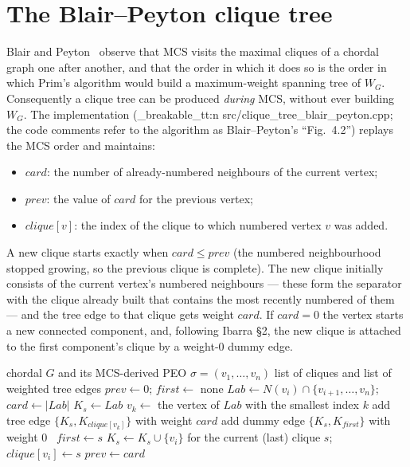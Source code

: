 \documentclass[11pt,a4paper,oneside]{report}
\theoremstyle{plain}
\theoremstyle{definition}
\theoremstyle{remark}
\DeclareRobustCommand{\file}[1]{\mtp_breakable_tt:n {#1}}
\begin{document}
\section{The Blair--Peyton clique tree}\label{sec:bp}
Blair and Peyton~\cite[\S4.2]{blair1993} observe that MCS visits the maximal cliques of a
chordal graph one after another, and that the order in which it does so is the order in which
Prim's algorithm would build a maximum-weight spanning tree of \(W_G\). Consequently a clique
tree can be produced \emph{during} MCS, without ever building \(W_G\). The implementation
(\file{src/clique_tree_blair_peyton.cpp}; the code comments refer to the algorithm as
Blair--Peyton's ``Fig.~4.2'') replays the MCS order and maintains:
\begin{itemize}
\item \(\mathit{card}\): the number of already-numbered neighbours of the current vertex;
\item \(\mathit{prev}\): the value of \(\mathit{card}\) for the previous vertex;
\item \(\mathit{clique}[v]\): the index of the clique to which numbered vertex \(v\) was added.
\end{itemize}
A new clique starts exactly when \(\mathit{card}\le\mathit{prev}\) (the numbered neighbourhood
stopped growing, so the previous clique is complete). The new clique initially consists of the
current vertex's numbered neighbours --- these form the separator with the clique already built
that contains the most recently numbered of them --- and the tree edge to that clique gets
weight \(\mathit{card}\). If \(\mathit{card}=0\) the vertex starts a new connected component,
and, following Ibarra \S2, the new clique is attached to the first component's clique by a
weight-0 dummy edge.

\begin{algorithm}[ht]
\caption{Clique tree from MCS (after Blair and Peyton~\cite[\S4.2]{blair1993}) with dummy edges
(Ibarra \S2)}\label{alg:bp}
\begin{algorithmic}[1]
\Require chordal \(G\) and its MCS-derived PEO \(\sigma=(v_1,\dots,v_n)\)
\Ensure list of cliques and list of weighted tree edges
\State \(\mathit{prev}\gets 0\); \(\mathit{first}\gets\) none
 
  \State \(\mathit{Lab}\gets N(v_i)\cap\{v_{i+1},\dots,v_n\}\); \(\mathit{card}\gets|\mathit{Lab}|\)
   
    \State \(K_s\gets\mathit{Lab}\)
      \State \(v_k\gets\) the vertex of \(\mathit{Lab}\) with the smallest index \(k\)
      \State add tree edge \(\{K_s,K_{\mathit{clique}[v_k]}\}\) with weight \(\mathit{card}\)
      \State add dummy edge \(\{K_s,K_{\mathit{first}}\}\) with weight 0
    \Else\ \(\mathit{first}\gets s\)
    \EndIf
  \EndIf
  \State \(K_s\gets K_s\cup\{v_i\}\) for the current (last) clique \(s\); \(\mathit{clique}[v_i]\gets s\)
  \State \(\mathit{prev}\gets\mathit{card}\)
\EndFor
\end{algorithmic}
\end{algorithm}
\end{document}
